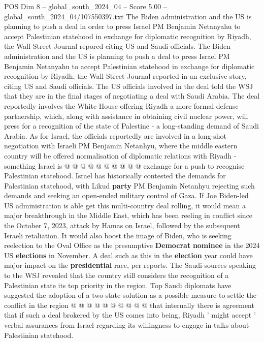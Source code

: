 \begin{textsample}{POS Dim 8 – global\_south\_2024\_04 – Score 5.00 – global\_south\_2024\_04/107550397.txt}  \label{ex:f8_pos_198}
The Biden administration and the US is planning to push a deal in order to press Israel PM Benjamin Netanyahu to accept Palestinian statehood in exchange for diplomatic recognition by Riyadh, the Wall Street Journal repored citing US and Saudi officials.
The Biden administration and the US is planning to push a deal to press Israel PM Benjamin Netanyahu to accept Palestinian statehood in exchange for diplomatic recognition by Riyadh, the Wall Street Journal reported in an exclusive story, citing US and Saudi officials.
The US officials involved in the deal told the WSJ that they are in the final stages of negotiating a deal with Saudi Arabia.
The deal reportedly involves the White House offering Riyadh a more formal defense partnership, which, along with assistance in obtaining civil nuclear power, will press for a recognition of the state of Palestine - a long-standing demand of Saudi Arabia.
As for Israel, the officials reportedly are involved in a long-shot negotiation with Israeli PM Benjamin Netanhyu, where the middle eastern country will be offered normalisation of diplomatic relations with Riyadh - something Israel is @ @ @ @ @ @ @ @ @ @ exchange for a push to recognise Palestinian statehood.
Israel has historically contested the demands for Palestinian statehood, with Likud \textbf{party} PM Benjamin Netanhyu rejecting such demands and seeking an open-ended military control of Gaza.
If Joe Biden-led US administration is able get this multi-country deal rolling, it would mean a major breakthrough in the Middle East, which has been reeling in conflict since the October 7, 2023, attack by Hamas on Israel, followed by the subsequent Israeli retaliation.
It would also boost the image of Biden, who is seeking reelection to the Oval Office as the presumptive \textbf{Democrat} \textbf{nominee} in the 2024 US \textbf{elections} in November.
A deal such as this in the \textbf{election} year could have major impact on the \textbf{presidential} race, per reports.
The Saudi sources speaking to the WSJ revealed that the country still considers the recognition of a Palestinian state its top priority in the region.
Top Saudi diplomats have suggested the adoption of a two-state solution as a possible measure to settle the conflict in the region @ @ @ @ @ @ @ @ @ @ that internally there is agreement that if such a deal brokered by the US comes into being, Riyadh ' might accept ' verbal assurances from Israel regarding its willingness to engage in talks about Palestinian statehood.

\end{textsample}
